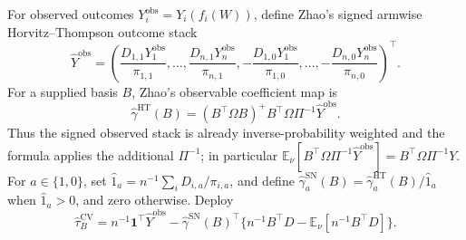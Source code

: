 For observed outcomes \(Y_i^{\mathrm{obs}}=Y_i(f_i(W))\), define Zhao's signed armwise Horvitz--Thompson outcome stack
\[
\widehat Y^{\mathrm{obs}}=
\left(\frac{D_{1,1}Y_1^{\mathrm{obs}}}{\pi_{1,1}},\ldots,
\frac{D_{n,1}Y_n^{\mathrm{obs}}}{\pi_{n,1}},
-\frac{D_{1,0}Y_1^{\mathrm{obs}}}{\pi_{1,0}},\ldots,
-\frac{D_{n,0}Y_n^{\mathrm{obs}}}{\pi_{n,0}}\right)^{\top}.
\]
For a supplied basis \(B\), Zhao's observable coefficient map is
\[
\widehat\gamma^{\mathrm{HT}}(B)
=(B^{\top}\Omega B)^+B^{\top}\Omega\Pi^{-1}\widehat Y^{\mathrm{obs}}.
\]
Thus the signed observed stack is already inverse-probability weighted and the formula applies the additional \(\Pi^{-1}\); in particular
\(\mathbb E_\nu[B^{\top}\Omega\Pi^{-1}\widehat Y^{\mathrm{obs}}]
=B^{\top}\Omega\Pi^{-1}Y\).
For \(a\in\{1,0\}\), set \(\widehat1_a=n^{-1}\sum_iD_{i,a}/\pi_{i,a}\), and define \(\widehat\gamma_a^{\mathrm{SN}}(B)=\widehat\gamma_a^{\mathrm{HT}}(B)/\widehat1_a\) when \(\widehat1_a>0\), and zero otherwise.  Deploy
\[
\widehat\tau_B^{\mathrm{CV}}
=n^{-1}\mathbf1^{\top}\widehat Y^{\mathrm{obs}}
-\widehat\gamma^{\mathrm{SN}}(B)^{\top}
\{n^{-1}B^{\top}D-\mathbb E_\nu[n^{-1}B^{\top}D]\}.
\]